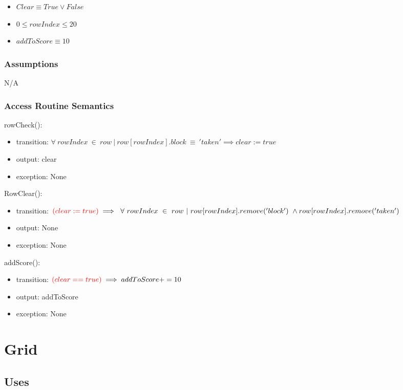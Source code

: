 \documentclass[12pt]{article}
\begin{document}
\begin{itemize}
    \item $Clear \equiv True \lor False$
    \item $0 \leq rowIndex \leq 20$
    \item $addToScore \equiv 10$
\end{itemize}

\subsubsection*{Assumptions}

N/A

\subsubsection* {Access Routine Semantics}

\noindent rowCheck():
\begin{itemize}
\item transition: $\forall~ rowIndex ~\in~ row ~|~ row[rowIndex].block ~\equiv~ 'taken' \implies clear := true$
\item output: clear
\item exception: None
\end{itemize}

\noindent RowClear():
\begin{itemize}
\item transition: $ \textcolor{red}{(clear := true)} \implies ~\forall~ rowIndex ~\in~ row ~|~ row[rowIndex].remove('block') ~\land~ \\row[rowIndex].remove('taken')$
\item output: None
\item exception: None
\end{itemize}

\noindent addScore():
\begin{itemize}
\item transition: $ \textcolor{red}{(clear == true)} \implies addToScore += 10$
\item output: addToScore
\item exception: None
\end{itemize}


\newpage

\section*{Grid}

\subsection*{Uses}
\end{document}
